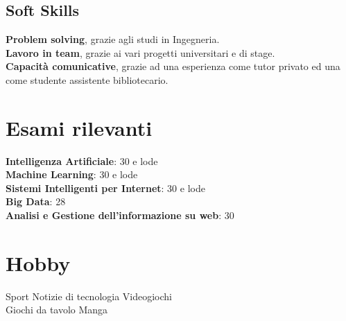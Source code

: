 \documentclass[]{deedy-resume-openfont}
\begin{document}
\begin{minipage}[t]{0.33\textwidth}
\subsection{Soft Skills}
\textbf{Problem solving}, grazie agli studi in Ingegneria. \\
\textbf{Lavoro in team}, grazie ai vari progetti universitari e di stage. \\
\textbf{Capacità comunicative}, grazie ad una esperienza come tutor privato ed una come studente assistente bibliotecario.
\sectionsep


\section{Esami rilevanti}
\textbf{Intelligenza Artificiale}: 30 e lode \\
\textbf{Machine Learning}: 30 e lode \\
\textbf{Sistemi Intelligenti per Internet}: 30 e lode \\
\textbf{Big Data}: 28 \\
\textbf{Analisi e Gestione dell'informazione su web}: 30
\sectionsep


\section{Hobby}
Sport \textbullet{} Notizie di tecnologia \textbullet{} Videogiochi \\
Giochi da tavolo \textbullet{} Manga

%
%

\end{minipage}
\hfill
\end{document}
